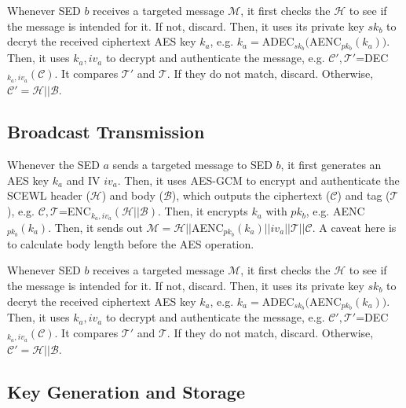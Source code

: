 \documentclass[11pt,oneside,onecolumn,letterpaper]{article}
\begin{document}
Whenever SED $b$ receives a targeted message $\mathcal{M}$, it first checks the $\mathcal{H}$ to see if the message is intended for it. If not, discard.
Then, it uses its private key $sk_b$ to decryt the received ciphertext AES key $k_a$, e.g. $k_a=$ADEC$_{sk_b}($AENC$_{pk_b}(k_a))$.
Then, it uses $k_a, iv_a$ to decrypt and authenticate the message, e.g. $\mathcal{C'}, \mathcal{T'}$=DEC$_{k_a, iv_a}(\mathcal{C})$.
It compares $\mathcal{T'}$ and $\mathcal{T}$.
If they do not match, discard.
Otherwise, $\mathcal{C'}=\mathcal{H}||\mathcal{B}$.


\subsection{Broadcast Transmission}

Whenever the SED $a$ sends a targeted message to SED $b$, it first generates an AES key $k_a$ and IV $iv_a$. 
Then, it uses AES-GCM to encrypt and authenticate the SCEWL header ($\mathcal{H}$) and body ($\mathcal{B}$), which outputs the ciphertext ($\mathcal{C}$) and tag ($\mathcal{T}$), e.g. $\mathcal{C}, \mathcal{T}$=ENC$_{k_a, iv_a}(\mathcal{H} || \mathcal{B})$.
Then, it encrypts $k_a$ with $pk_b$, e.g. AENC$_{pk_b}(k_a)$.
Then, it sends out $\mathcal{M}=\mathcal{H} || $AENC$_{pk_b}(k_a)||iv_a||\mathcal{T}||\mathcal{C}$.
A caveat here is to calculate body length before the AES operation.

Whenever SED $b$ receives a targeted message $\mathcal{M}$, it first checks the $\mathcal{H}$ to see if the message is intended for it. If not, discard.
Then, it uses its private key $sk_b$ to decryt the received ciphertext AES key $k_a$, e.g. $k_a=$ADEC$_{sk_b}($AENC$_{pk_b}(k_a))$.
Then, it uses $k_a, iv_a$ to decrypt and authenticate the message, e.g. $\mathcal{C'}, \mathcal{T'}$=DEC$_{k_a, iv_a}(\mathcal{C})$.
It compares $\mathcal{T'}$ and $\mathcal{T}$.
If they do not match, discard.
Otherwise, $\mathcal{C'}=\mathcal{H}||\mathcal{B}$.

\subsection{Key Generation and Storage}
\end{document}
